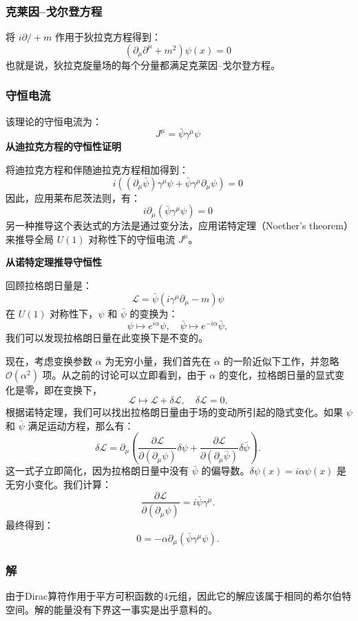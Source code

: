 \subsubsection{克莱因–戈尔登方程}
将 \( i\partial \!\!\!/+m \) 作用于狄拉克方程得到：
\[
(\partial_\mu \partial^\mu + m^2)\psi(x) = 0~
\]
也就是说，狄拉克旋量场的每个分量都满足克莱因–戈尔登方程。
\subsubsection{守恒电流}
该理论的守恒电流为：
\[
J^\mu = \bar{\psi} \gamma^\mu \psi~
\]
\textbf{从迪拉克方程的守恒性证明}

将迪拉克方程和伴随迪拉克方程相加得到：
\[
i\left((\partial_{\mu} \bar{\psi}) \gamma^{\mu} \psi + \bar{\psi} \gamma^{\mu} \partial_{\mu} \psi \right) = 0~
\]
因此，应用莱布尼茨法则，有：
\[
i \partial_{\mu} (\bar{\psi} \gamma^{\mu} \psi) = 0~
\]
另一种推导这个表达式的方法是通过变分法，应用诺特定理（Noether's theorem）来推导全局 \( U(1) \) 对称性下的守恒电流 \( J^{\mu} \)。

\textbf{从诺特定理推导守恒性}

回顾拉格朗日量是：
\[
\mathcal{L} = {\bar {\psi }}(i\gamma^{\mu} \partial_{\mu} - m)\psi~
\]
在 \( U(1) \) 对称性下，\( \psi \) 和 \( \bar{\psi} \) 的变换为：
\[
\psi \mapsto e^{i\alpha} \psi, \quad {\bar {\psi}} \mapsto e^{-i\alpha} {\bar {\psi}},~
\]
我们可以发现拉格朗日量在此变换下是不变的。

现在，考虑变换参数 \( \alpha \) 为无穷小量，我们首先在 \( \alpha \) 的一阶近似下工作，并忽略 \( \mathcal{O}(\alpha^2) \) 项。从之前的讨论可以立即看到，由于 \( \alpha \) 的变化，拉格朗日量的显式变化是零，即在变换下，
\[
\mathcal{L} \mapsto \mathcal{L} + \delta \mathcal{L}, \quad \delta \mathcal{L} = 0.~
\]
根据诺特定理，我们可以找出拉格朗日量由于场的变动所引起的隐式变化。如果 \( \psi \) 和 \( {\bar {\psi}} \) 满足运动方程，那么有：
\[
\delta \mathcal{L} = \partial_{\mu} \left( \frac{\partial \mathcal{L}}{\partial (\partial_{\mu} \psi)} \delta \psi + \frac{\partial \mathcal{L}}{\partial (\partial_{\mu} {\bar {\psi}})} \delta {\bar {\psi}} \right).~
\]
这一式子立即简化，因为拉格朗日量中没有 \( {\bar {\psi}} \) 的偏导数。\( \delta \psi(x) = i\alpha \psi(x) \) 是无穷小变化。我们计算：
\[
\frac{\partial \mathcal{L}}{\partial (\partial_{\mu} \psi)} = i{\bar {\psi}} \gamma^{\mu}.~
\]
最终得到：
\[
0 = -\alpha \partial_{\mu} ({\bar {\psi}} \gamma^{\mu} \psi).~
\]
\subsubsection{解}
由于Dirac算符作用于平方可积函数的4元组，因此它的解应该属于相同的希尔伯特空间。解的能量没有下界这一事实是出乎意料的。

